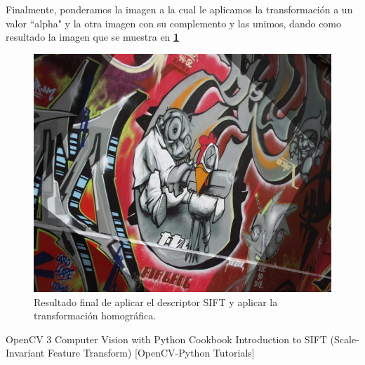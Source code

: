 \documentclass[11pt, a4paper]{article}
\begin{document}
	

	Finalmente, ponderamos la imagen a la cual le aplicamos la transformación a un valor ``alpha" y la otra imagen con su complemento y las unimos, dando como resultado la imagen que se muestra en \textcolor{blue}{\textbf{\ref{fig:sift_out}}}
	
	
	
	\begin{figure}[H]
		\centering
		\includegraphics[width=\textwidth]{Imagenes/sift_out.png}
		\caption{Resultado final de aplicar el descriptor SIFT y aplicar la transformación homográfica.}
		\label{fig:sift_out}
	\end{figure} 

	\begin{thebibliography}{0}
		\bibitem{}  OpenCV 3 Computer Vision with Python Cookbook 
		\bibitem{}  Introduction to SIFT (Scale-Invariant Feature Transform) [OpenCV-Python Tutorials]
	\end{thebibliography}
\end{document}
